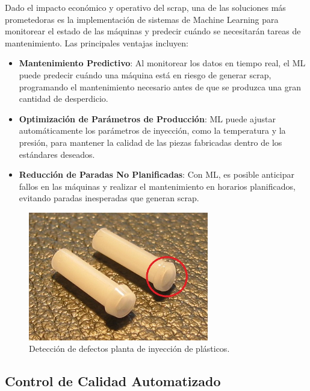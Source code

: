 
Dado el impacto económico y operativo del scrap, una de las soluciones más prometedoras es la implementación de sistemas de Machine Learning para monitorear el estado de las máquinas y predecir cuándo se necesitarán tareas de mantenimiento. Las principales ventajas incluyen:

\begin{itemize}
    \item \textbf{Mantenimiento Predictivo}: Al monitorear los datos en tiempo real, el ML puede predecir cuándo una máquina está en riesgo de generar scrap, programando el mantenimiento necesario antes de que se produzca una gran cantidad de desperdicio.
    \item \textbf{Optimización de Parámetros de Producción}: ML puede ajustar automáticamente los parámetros de inyección, como la temperatura y la presión, para mantener la calidad de las piezas fabricadas dentro de los estándares deseados.
    \item \textbf{Reducción de Paradas No Planificadas}: Con ML, es posible anticipar fallos en las máquinas y realizar el mantenimiento en horarios planificados, evitando paradas inesperadas que generan scrap.
\end{itemize}

\begin{figure}[H]
\centering
\includegraphics[width=0.7\textwidth]{img/ob_scrapt.jpg}
\caption{Detección de defectos planta de inyección de plásticos.}
\label{fig:scrap_impact}
\end{figure} 

\subsection{Control de Calidad Automatizado}

